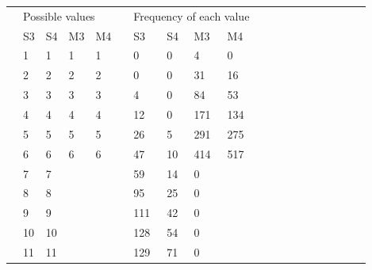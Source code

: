 \documentclass[12pt]{article}
\begin{document}
\begin{table}[h]
\centering
\label{my-label}
\begin{tabular}{l|l|l|l|l|l|l|l|l|l|llllllllll}
\cline{2-10}
\multirow{12}{*}{} & \multicolumn{4}{l|}{Possible values} &  & \multicolumn{4}{l|}{Frequency of each value} &  &  &  &  &  &  &  &  &  &  \\ \cline{2-10}
                   & S3      & S4      & M3      & M4     &  & S3        & S4        & M3        & M4       &  &  &  &  &  &  &  &  &  &  \\ \cline{2-10}
                   & 1       & 1       & 1       & 1      &  & 0         & 0         & 4         & 0        &  &  &  &  &  &  &  &  &  &  \\ \cline{2-10}
                   & 2       & 2       & 2       & 2      &  & 0         & 0         & 31        & 16       &  &  &  &  &  &  &  &  &  &  \\ \cline{2-10}
                   & 3       & 3       & 3       & 3      &  & 4         & 0         & 84        & 53       &  &  &  &  &  &  &  &  &  &  \\ \cline{2-10}
                   & 4       & 4       & 4       & 4      &  & 12        & 0         & 171       & 134      &  &  &  &  &  &  &  &  &  &  \\ \cline{2-10}
                   & 5       & 5       & 5       & 5      &  & 26        & 5         & 291       & 275      &  &  &  &  &  &  &  &  &  &  \\ \cline{2-10}
                   & 6       & 6       & 6       & 6      &  & 47        & 10        & 414       & 517      &  &  &  &  &  &  &  &  &  &  \\ \cline{2-10}
                   & 7       & 7       &         &        &  & 59        & 14        & 0         &          &  &  &  &  &  &  &  &  &  &  \\ \cline{2-10}
                   & 8       & 8       &         &        &  & 95        & 25        & 0         &          &  &  &  &  &  &  &  &  &  &  \\ \cline{2-10}
                   & 9       & 9       &         &        &  & 111       & 42        & 0         &          &  &  &  &  &  &  &  &  &  &  \\ \cline{2-10}
                   & 10      & 10      &         &        &  & 128       & 54        & 0         &          &  &  &  &  &  &  &  &  &  &  \\ \cline{2-10}
                   & 11      & 11      &         &        &  & 129       & 71        & 0         &          &  &  &  &  &  &  &  &  &  &  \\ \cline{2-10}

\end{tabular}
\end{table}
\end{document}

